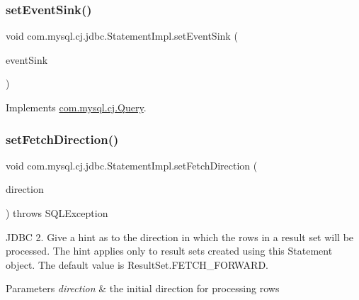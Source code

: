 \subsubsection{\texorpdfstring{set\+Event\+Sink()}{setEventSink()}}
{\footnotesize\ttfamily void com.\+mysql.\+cj.\+jdbc.\+Statement\+Impl.\+set\+Event\+Sink (\begin{DoxyParamCaption}\item[{\mbox{\hyperlink{interfacecom_1_1mysql_1_1cj_1_1log_1_1_profiler_event_handler}{Profiler\+Event\+Handler}}}]{event\+Sink }\end{DoxyParamCaption})}



Implements \mbox{\hyperlink{interfacecom_1_1mysql_1_1cj_1_1_query_ad50d1ecd73b6b2cac60cff6bec83bfbf}{com.\+mysql.\+cj.\+Query}}.

\mbox{\label{classcom_1_1mysql_1_1cj_1_1jdbc_1_1_statement_impl_a5f61e150957f4bdfa9682061008d448f}} 
\subsubsection{\texorpdfstring{set\+Fetch\+Direction()}{setFetchDirection()}}
{\footnotesize\ttfamily void com.\+mysql.\+cj.\+jdbc.\+Statement\+Impl.\+set\+Fetch\+Direction (\begin{DoxyParamCaption}\item[{int}]{direction }\end{DoxyParamCaption}) throws S\+Q\+L\+Exception}

J\+D\+BC 2. Give a hint as to the direction in which the rows in a result set will be processed. The hint applies only to result sets created using this Statement object. The default value is Result\+Set.\+F\+E\+T\+C\+H\+\_\+\+F\+O\+R\+W\+A\+RD.


\begin{DoxyParams}{Parameters}
{\em direction} & the initial direction for processing rows\\
\hline
\end{DoxyParams}

